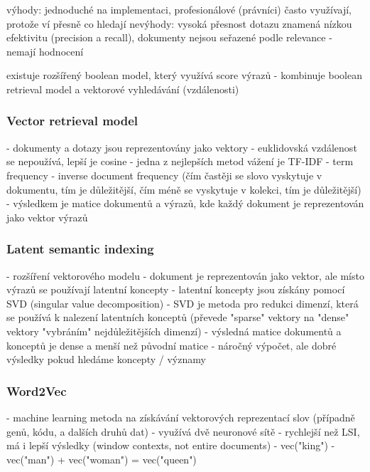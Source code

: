 výhody: jednoduché na implementaci, profesionálové (právníci) často využívají, protože ví přesně co hledají
nevýhody: vysoká přesnost dotazu znamená nízkou efektivitu (precision a recall), dokumenty nejsou seřazené podle relevance - nemají hodnocení

existuje rozšířený boolean model, který využívá score výrazů - kombinuje boolean retrieval model a vektorové vyhledávání (vzdálenosti)

\subsubsection*{Vector retrieval model}

- dokumenty a dotazy jsou reprezentovány jako vektory
- euklidovská vzdálenost se nepoužívá, lepší je cosine
- jedna z nejlepších metod vážení je TF-IDF - term frequency - inverse document frequency (čím častěji se slovo vyskytuje v dokumentu, tím je důležitější, čím méně se vyskytuje v kolekci, tím je důležitější)
- výsledkem je matice dokumentů a výrazů, kde každý dokument je reprezentován jako vektor výrazů

\subsubsection*{Latent semantic indexing}

- rozšíření vektorového modelu
- dokument je reprezentován jako vektor, ale místo výrazů se používají latentní koncepty
- latentní koncepty jsou získány pomocí SVD (singular value decomposition)
- SVD je metoda pro redukci dimenzí, která se používá k nalezení latentních konceptů (převede "sparse" vektory na "dense" vektory "vybráním" nejdůležitějších dimenzí)
- výsledná matice dokumentů a konceptů je dense a menší než původní matice 
- náročný výpočet, ale dobré výsledky pokud hledáme koncepty / významy

\subsubsection*{Word2Vec}

- machine learning metoda na získávání vektorových reprezentací slov (případně genů, kódu, a dalších druhů dat)
- využívá dvě neuronové sítě
- rychlejší než LSI, má i lepší výsledky (window contexts, not entire documents)
- vec("king") - vec("man") + vec("woman") = vec("queen")
